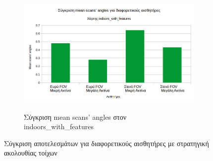 \begin{figure}[H]
\begin{subfigure}[b]{0.5\textwidth}
         \includegraphics[width=\textwidth]{./images/chapter6/indoors_with_features_mean_angles_compare.png}
         \label{fig:indoors_with_features_mean_angles_compare}
         \caption{Σύγκριση mean scans' angles στον indoors\_with\_features}
     \end{subfigure}
     
     \caption{Σύγκριση αποτελεσμάτων για διαφορετικούς αισθητήρες με στρατηγική ακολουθίας τοίχων}
    \label{fig:sensors_compare}
\end{figure}


